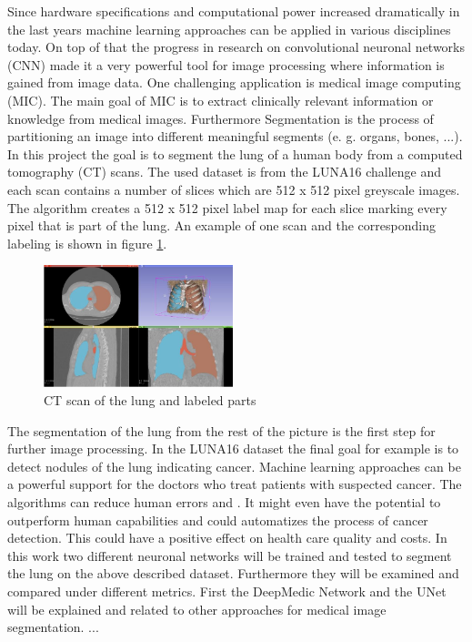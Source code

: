 
Since hardware specifications and computational power increased dramatically in the last years machine learning approaches can be applied in various disciplines today. On top of that the progress in research on convolutional neuronal networks (CNN) made it a very powerful tool for image processing where information is gained from image data.\newline
One challenging application is medical image computing (MIC). The main goal of MIC is to extract clinically relevant information or knowledge from medical images. Furthermore Segmentation is the process of partitioning an image into different meaningful segments (e. g. organs, bones, ...).\newline
In this project the goal is to segment the lung of a human body from a computed tomography (CT) scans.\newline
The used dataset is from the LUNA16 challenge \cite{luna} and each scan contains a number of slices which are 512 x 512 pixel greyscale images. The algorithm creates a 512 x 512 pixel label map for each slice marking every pixel that is part of the lung. An example of one scan and the corresponding labeling is shown in figure \ref{scan_picture}.

\begin{figure}[h!]
	\includegraphics[width=0.49\textwidth, angle=0]{files/scan_picture.jpg}
	\caption{CT scan of the lung and labeled parts}
	\label{scan_picture}
\end{figure}

The segmentation of the lung from the rest of the picture is the first step for further image processing. In the LUNA16 dataset the final goal for example is to detect nodules of the lung indicating cancer. Machine learning approaches can be a powerful support for the doctors who treat patients with suspected cancer. The algorithms can reduce human errors and . It might even have the potential to outperform human capabilities and could automatizes the process of cancer detection. This could have a positive effect on health care quality and costs.\newline
In this work two different neuronal networks will be trained and tested to segment the lung on the above described dataset. Furthermore they will be examined and compared under different metrics.
First the DeepMedic Network and the UNet will be explained and related to other approaches for medical image segmentation. 
... 
